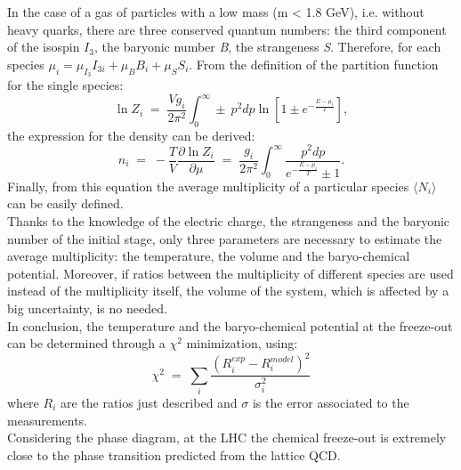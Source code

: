 In the case of a gas of particles with a low mass (m < 1.8 GeV), i.e. without heavy quarks, there are three conserved quantum numbers: the third component of the isospin $I_{3}$, the baryonic number \textit{B}, the strangeness \textit{S}. Therefore, for each species $\mu_{i} = \mu_{I_{3}}I_{3i} + \mu_{B}B_{i} + \mu_{S}S_{i}$.
From the definition of the partition function for the single species:
\begin{equation}
 \ln Z_{i}\; = \; \frac{Vg_{i}}{2\pi^{2}}\int_{0}^{\infty}\pm\:p^{2}dp\ln[1\pm e^{-\frac{E-\mu_{i}}{T}}],
\end{equation}
the expression for the density can be derived:
\begin{equation}
n_{i}\; = \; -\frac{T}{V} \frac{\partial \ln Z_{i}}{\partial \mu} \;=\; \frac{g_{i}}{2\pi^{2}} \int_{0}^{\infty}\frac{p^{2}dp}{e^{-\frac{E-\mu_{i}}{T}}\pm1}.
\end{equation}
Finally, from this equation the average multiplicity of a particular species $\langle N_{i} \rangle$ can be easily defined.\\
Thanks to the knowledge of the electric charge, the strangeness and the baryonic number of the initial stage, only three parameters are necessary to estimate the average multiplicity: the temperature, the volume and the baryo-chemical potential. Moreover, if ratios between the multiplicity of different species are used instead of the multiplicity itself, the volume of the system, which is affected by a big uncertainty, is no needed.\\
In conclusion, the temperature and the baryo-chemical potential at the freeze-out can be determined through a $\chi^{2}$ minimization, using:
\begin{equation}
 \chi^{2}\;=\;\sum_{i}\frac{(R_{i}^{exp}-R_{i}^{model})^{2}}{\sigma_{i}^{2}}
\end{equation}
where $R_{i}$ are the ratios just described and $\sigma$ is the error associated to the measurements.\\
Considering the phase diagram, at the LHC the chemical freeze-out is extremely close to the phase transition predicted from the lattice QCD.\\
%
